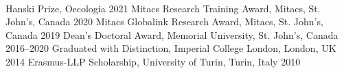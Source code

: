 \\

\begin{cvhonors}

  \mycvhonor
    {Hanski Prize,} %
    {Oecologia} %
    {2021} %
  \mycvhonor
    {Mitacs Research Training Award,} %
    {Mitacs, St. John's, Canada} %
    {2020} %
  \mycvhonor
    {Mitacs Globalink Research Award,} %
    {Mitacs, St. John's, Canada} %
    {2019} %
  \mycvhonor
    {Dean's Doctoral Award,} %
    {Memorial University, St. John's, Canada} %
    {2016--2020} %
  \mycvhonor
    {Graduated with Distinction,} %
    {Imperial College London, London, UK} %
    {2014} %
  \mycvhonor
    {Erasmus-LLP Scholarship,} %
    {University of Turin, Turin, Italy} %
    {2010} %
\end{cvhonors}